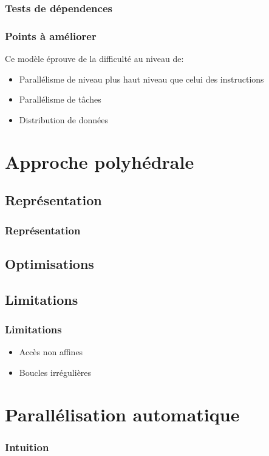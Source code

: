 \documentclass{beamer}
\begin{document}
\begin{frame}
\frametitle{Tests de dépendences}

\end{frame}

\begin{frame}
\frametitle{Points à améliorer}
Ce modèle éprouve de la difficulté au niveau de:
\begin{itemize}
\item Parallélisme de niveau plus haut niveau que celui des instructions
\item Parallélisme de tâches
\item Distribution de données
\end{itemize}
\end{frame}

\section{Approche polyhédrale}
\subsection{Représentation}
\begin{frame}
\frametitle{Représentation}

\end{frame}

\subsection{Optimisations}

\subsection{Limitations}
\begin{frame}
\frametitle{Limitations}
\begin{itemize}
\item Accès non affines
\item Boucles irrégulières
\end{itemize}
\end{frame}

\section{Parallélisation automatique}
\begin{frame}
\frametitle{Intuition}

\end{frame}
\end{document}
